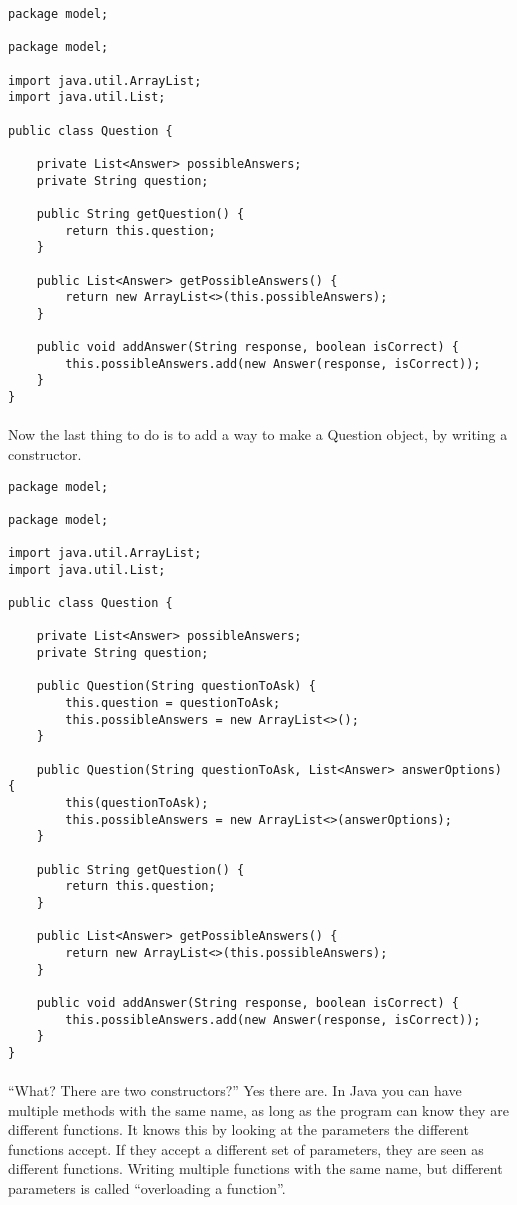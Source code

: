 \documentclass[11pt,fleqn]{book} %
\begin{document}
\begin{lstlisting}[caption=Question.java]
package model;

package model;

import java.util.ArrayList;
import java.util.List;

public class Question {
	
	private List<Answer> possibleAnswers;
	private String question;
	
	public String getQuestion() {
		return this.question;
	}
	
	public List<Answer> getPossibleAnswers() {
		return new ArrayList<>(this.possibleAnswers);
	}
	
	public void addAnswer(String response, boolean isCorrect) {
		this.possibleAnswers.add(new Answer(response, isCorrect));
	}
}
\end{lstlisting}

\paragraph{}Now the last thing to do is to add a way to make a Question object, by writing a constructor.
\begin{lstlisting}
package model;

package model;

import java.util.ArrayList;
import java.util.List;

public class Question {
	
	private List<Answer> possibleAnswers;
	private String question;
	
	public Question(String questionToAsk) {
		this.question = questionToAsk;
		this.possibleAnswers = new ArrayList<>();
	}
	
	public Question(String questionToAsk, List<Answer> answerOptions) {
		this(questionToAsk);
		this.possibleAnswers = new ArrayList<>(answerOptions);
	}
	
	public String getQuestion() {
		return this.question;
	}
	
	public List<Answer> getPossibleAnswers() {
		return new ArrayList<>(this.possibleAnswers);
	}
	
	public void addAnswer(String response, boolean isCorrect) {
		this.possibleAnswers.add(new Answer(response, isCorrect));
	}
}
\end{lstlisting}
\paragraph{} ``What? There are two constructors?'' Yes there are. In Java you can have multiple methods with the same name, as long as the program can know they are different functions. It knows this by looking at the parameters the different functions accept. If they accept a different set of parameters, they are seen as different functions. Writing multiple functions with the same name, but different parameters is called ``overloading a function''.
\end{document}
